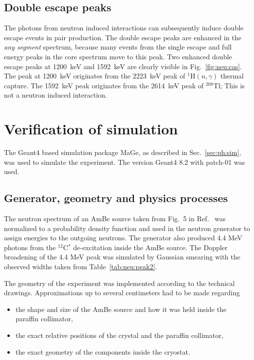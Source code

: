 \subsection{Double escape peaks}
\label{sec:neu:dep}
The photons from neutron induced interactions can subsequently induce double escape events in pair production. The double escape peaks are enhanced in the \emph{any segment} spectrum, because many events from the single escape and full energy peaks in the core spectrum move to this peak. Two enhanced double escape peaks at 1200~keV and 1592~keV are clearly visible in Fig.~\ref{fig:neu:cas}. The peak at 1200~keV originates from the 2223~keV peak of $^{1}$H$(n,\gamma)$ thermal capture. The 1592~keV peak originates from the 2614~keV peak of $^{208}$Tl; This is not a neutron induced interaction.


\section{Verification of simulation}
\label{sec:neu:sim}
The Geant4 \cite{Gea03, Gea06} based simulation package MaGe, as described in Sec.~\ref{sec:ph:sim}, was used to simulate the experiment. The version Geant4 8.2 with patch-01 was used.

\subsection{Generator, geometry and physics processes}
\label{sec:simdetail}
The neutron spectrum of an AmBe source taken from Fig.~5 in Ref.~\cite{Mar95} was normalized to a probability density function and used in the neutron generator to assign energies to the outgoing neutrons. The generator also produced 4.4 MeV photons from the $^{12}$C$^{*}$ de-excitation inside the AmBe source. The Doppler broadening of the 4.4 MeV peak was simulated by Gaussian smearing with the observed widths taken from Table~\ref{tab:neu:peak2}.

The geometry of the experiment was implemented according to the technical drawings. Approximations up to several centimeters had to be made regarding
\begin{itemize}
\item the shape and size of the AmBe source and how it was held inside the paraffin collimator,
\item the exact relative positions of the crystal and the paraffin collimator,
\item the exact geometry of the components inside the cryostat.
\end{itemize}

